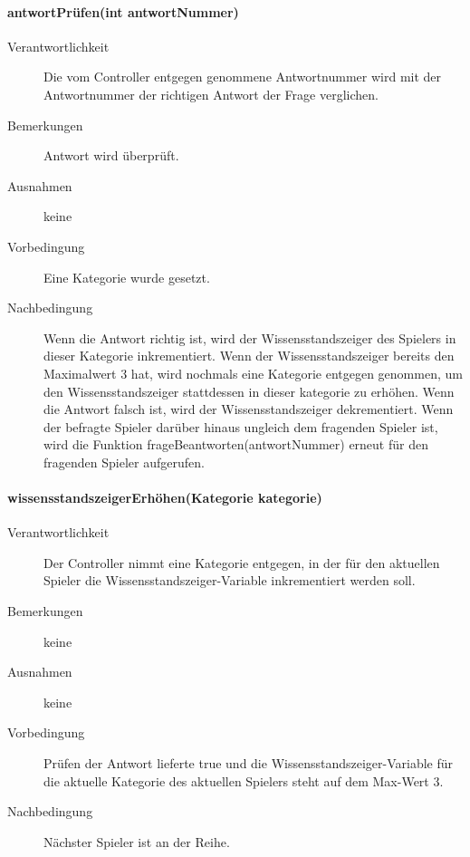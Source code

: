 \documentclass{report}
\begin{document}
\begin{description}
\begin{description}
\paragraph{antwortPrüfen(int antwortNummer)}
\begin{description}
	\item[Verantwortlichkeit] Die vom Controller entgegen genommene Antwortnummer wird mit der Antwortnummer der richtigen Antwort der Frage verglichen.
	\item[Bemerkungen] Antwort wird überprüft.
	\item[Ausnahmen] keine
	\item[Vorbedingung] Eine Kategorie wurde gesetzt.
	\item[Nachbedingung] Wenn die Antwort richtig ist, wird der Wissensstandszeiger des Spielers in dieser Kategorie inkrementiert. Wenn der Wissensstandszeiger bereits den Maximalwert 3 hat, wird nochmals eine Kategorie entgegen genommen, um den Wissensstandszeiger stattdessen in dieser kategorie zu erhöhen.\newline
	Wenn die Antwort falsch ist, wird der Wissensstandszeiger dekrementiert. Wenn der befragte Spieler darüber hinaus ungleich dem fragenden Spieler ist, wird die Funktion frageBeantworten(antwortNummer) erneut für den fragenden Spieler aufgerufen.
\end{description}

\paragraph{wissensstandszeigerErhöhen(Kategorie kategorie)}
\begin{description}
	\item[Verantwortlichkeit] Der Controller nimmt eine Kategorie entgegen, in der für den aktuellen Spieler die Wissensstandszeiger-Variable inkrementiert werden soll.
	\item[Bemerkungen] keine
	\item[Ausnahmen] keine
	\item[Vorbedingung] Prüfen der Antwort lieferte true und die Wissensstandszeiger-Variable für die aktuelle Kategorie des aktuellen Spielers steht auf dem Max-Wert 3.
	\item[Nachbedingung] Nächster Spieler ist an der Reihe.
\end{description}




\end{description}
\end{description}
\end{document}

